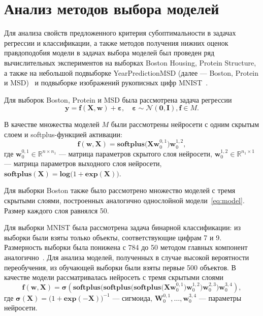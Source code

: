 \section{Анализ методов выбора моделей}
Для анализа свойств предложенного критерия субоптимальности в задачах регрессии и классификации, а также методов получения нижних оценок правдоподобия модели в задачах выбора моделей был проведен ряд вычислительных экспериментов на выборках Boston Housing, Protein Structure, а также на небольшой подвыборке YearPredictionMSD (далее --- Boston, Protein и MSD)~\cite{UCI} {и подвыборке изображений рукописных цифр MNIST~\cite{mnist}}.

{Для выборок Boston, Protein и MSD} была рассмотрена задача регрессии
\[
	\mathbf{y} = \mathbf{f}(\mathbf{X}, \mathbf{w}) + \boldsymbol{\varepsilon}, \quad  \boldsymbol{\varepsilon} \sim \mathcal{N}(\mathbf{0}, \mathbf{I}), \mathbf{f} \in {M}.
\]

В качестве множества моделей $M$ были рассмотрены  нейросети с одним скрытым слоем и softplus-функцией активации:
\begin{equation}
\label{eq:model}
	\mathbf{f}(\mathbf{w}, \mathbf{X}) =   \textbf{softplus}\bigl(\mathbf{X} \mathbf{w}_0^{0,1} \bigr)  \mathbf{w}_0^{1,2},
\end{equation}
где $\mathbf{w}_0^{0,1}  \in \mathbb{R}^{n\times n_1}$ --- матрица параметров скрытого слоя нейросети, $\mathbf{w}_0^{1,2} \in \mathbb{R}^{n_1\times 1}$ --- матрица параметров выходного слоя нейросети, {$\textbf{softplus}(\mathbf{X}) = \textbf{log}\bigl(1+\textbf{exp}(\mathbf{X})\bigr)$}.

{Для выборки Boston также было рассмотрено множество моделей с тремя скрытыми слоями, построенных аналогично однослойной модели~\eqref{eq:model}. Размер каждого слоя равнялся 50.}

{Для выборки MNIST была рассмотрена задача бинарной классификации: из выборки были взяты только объекты, соответствующие цифрам 7 и 9. Размерность выборки была понижена с 784 до 50 методом главных компонент аналогично~\cite{firefly}. Для анализа моделей, полученных в случае высокой вероятности переобучения, из обучающей выборки были взяты первые 500 объектов. В качестве модели рассматривалась нейросеть с тремя скрытыми слоями}
\[
    \mathbf{f}(\mathbf{w}, \mathbf{X}) =   \boldsymbol{\sigma}(\textbf{softplus}\bigl(  \textbf{softplus} \bigl(\textbf{softplus}\bigl(\mathbf{X} \mathbf{w}_0^{0,1} \bigr)  \mathbf{w}_0^{1,2} \bigr) \mathbf{w}_0^{2,3} \bigr) \mathbf{w}_0^{3,4}),
\]
{где $\boldsymbol{\sigma}(\mathbf{X}) = \bigl(1+\textbf{exp}(\mathbf{-X})\bigr)^{-1}$  --- сигмоида, $\mathbf{W}_0^{0,1}, \dots, \mathbf{w}_0^{3,4}$ --- параметры нейросети.}



